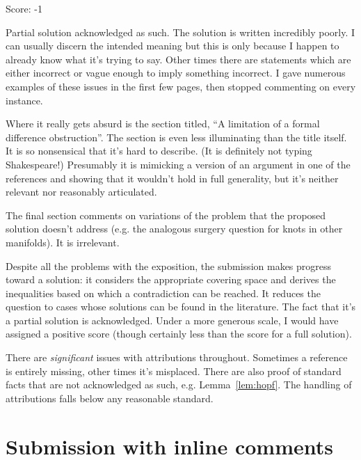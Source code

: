 \documentclass[11pt]{article}
\theoremstyle{remark}
\begin{document}
\noindent Score: -1 


Partial solution acknowledged as such. The solution is written incredibly poorly. I can usually discern the intended meaning but this is only because I happen to already know what it's trying to say. Other times there are statements which are either incorrect or vague enough to imply something incorrect. I gave numerous examples of these issues in the first few pages, then stopped commenting on every instance. 

Where it really gets absurd is the section titled, ``A limitation of a formal difference obstruction''. The section is even less illuminating than the title itself. It is so nonsensical that it's hard to describe. (It is definitely not typing Shakespeare!) Presumably it is mimicking a version of an argument in one of the references and showing that it wouldn't hold in full generality, but it's neither relevant nor reasonably articulated. 

The final section comments on variations of the problem that the proposed solution doesn't address (e.g. the analogous surgery question for knots in other manifolds). It is irrelevant. 

Despite all the problems with the exposition, the submission makes progress toward a solution: it considers the appropriate covering space and derives the inequalities based on which a contradiction can be reached. It reduces the question to cases whose solutions can be found in the literature. The fact that it's a partial solution is acknowledged. Under a more generous scale, I would have assigned a positive score (though certainly less than the score for a full solution).

There are {\it significant} issues with attributions throughout. Sometimes a reference is entirely missing, other times it's misplaced. There are also proof of standard facts that are not acknowledged as such, e.g. Lemma~\ref{lem:hopf}. The handling of attributions falls below any reasonable standard.


\newpage
\section{Submission with inline comments}
\end{document}
